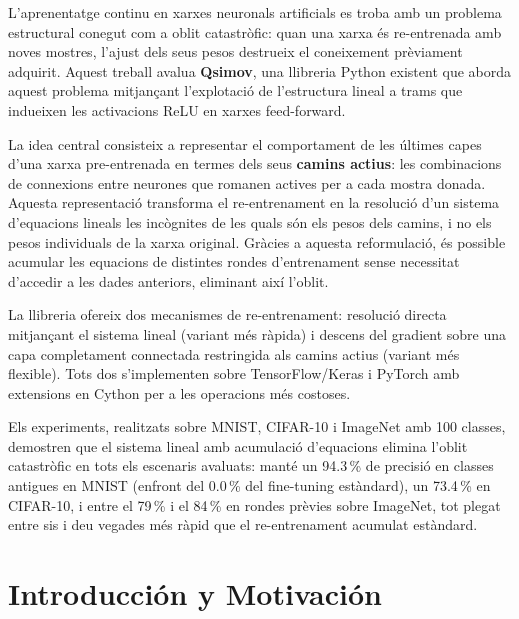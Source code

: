 \documentclass[twoside,spanish,a4paper,12pt]{tfg}
\begin{document}
\begin{resum}
L'aprenentatge continu en xarxes neuronals artificials es troba amb un problema estructural conegut
com a oblit catastròfic: quan una xarxa és re-entrenada amb noves mostres, l'ajust dels seus pesos
destrueix el coneixement prèviament adquirit. Aquest treball avalua \textbf{Qsimov}, una llibreria
Python existent que aborda aquest problema mitjançant l'explotació de l'estructura lineal a trams que
indueixen les activacions ReLU en xarxes feed-forward.

La idea central consisteix a representar el comportament de les últimes capes d'una xarxa
pre-entrenada en termes dels seus \textbf{camins actius}: les combinacions de connexions entre
neurones que romanen actives per a cada mostra donada. Aquesta representació transforma el
re-entrenament en la resolució d'un sistema d'equacions lineals les incògnites de les quals són els
pesos dels camins, i no els pesos individuals de la xarxa original. Gràcies a aquesta reformulació,
és possible acumular les equacions de distintes rondes d'entrenament sense necessitat d'accedir a les
dades anteriors, eliminant així l'oblit.

La llibreria ofereix dos mecanismes de re-entrenament: resolució directa mitjançant el sistema lineal
(variant més ràpida) i descens del gradient sobre una capa completament connectada restringida als
camins actius (variant més flexible). Tots dos s'implementen sobre TensorFlow/Keras i PyTorch amb
extensions en Cython per a les operacions més costoses.

Els experiments, realitzats sobre MNIST, CIFAR-10 i ImageNet amb 100 classes, demostren que el
sistema lineal amb acumulació d'equacions elimina l'oblit catastròfic en tots els escenaris avaluats:
manté un 94.3\,\% de precisió en classes antigues en MNIST (enfront del 0.0\,\% del fine-tuning
estàndard), un 73.4\,\% en CIFAR-10, i entre el 79\,\% i el 84\,\% en rondes prèvies sobre
ImageNet, tot plegat entre sis i deu vegades més ràpid que el re-entrenament acumulat estàndard.

\end{resum}
\cleardoublepage

\tableofcontents

\pagestyle{tfg}
\justify

\chapter{Introducción y Motivación}

\end{document}
